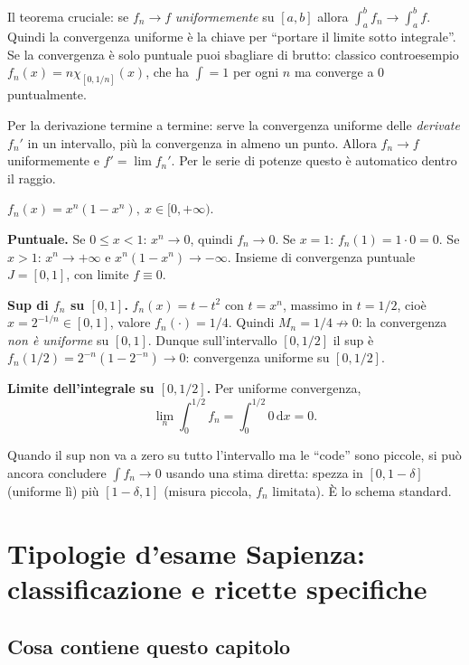 \documentclass[11pt,a4paper,openany]{book}
\theoremstyle{plain}
\theoremstyle{definition}
\theoremstyle{remark}
\newcommand{\dd}{\,\mathrm{d}}
\begin{document}
\begin{nota}
Il teorema cruciale: se $f_n\to f$ \emph{uniformemente} su $[a,b]$
allora $\int_a^b f_n\to\int_a^b f$. Quindi la convergenza
uniforme \`e la chiave per ``portare il limite sotto integrale''.
Se la convergenza \`e solo puntuale puoi sbagliare di brutto: classico
controesempio $f_n(x)=n\chi_{[0,1/n]}(x)$, che ha $\int=1$ per ogni $n$
ma converge a $0$ puntualmente.

Per la derivazione termine a termine: serve la convergenza uniforme
delle \emph{derivate} $f_n'$ in un intervallo, pi\`u la convergenza in
almeno un punto. Allora $f_n\to f$ uniformemente e $f'=\lim f_n'$.
Per le serie di potenze questo \`e automatico dentro il raggio.
\end{nota}

\begin{esempio}[title={Tipo Sapienza --- 4/7/2024}]
$\displaystyle f_n(x)=x^n(1-x^n),\ x\in[0,+\infty)$.

\textbf{Puntuale.} Se $0\le x<1$: $x^n\to 0$, quindi $f_n\to 0$.
Se $x=1$: $f_n(1)=1\cdot 0=0$. Se $x>1$: $x^n\to+\infty$ e
$x^n(1-x^n)\to-\infty$. Insieme di convergenza puntuale
$J=[0,1]$, con limite $f\equiv 0$.

\textbf{Sup di $f_n$ su $[0,1]$.} $f_n(x)=t-t^2$ con $t=x^n$,
massimo in $t=1/2$, cio\`e $x=2^{-1/n}\in[0,1]$, valore
$f_n(\cdot)=1/4$. Quindi $M_n=1/4\not\to 0$: la convergenza
\emph{non \`e uniforme} su $[0,1]$. Dunque sull'intervallo $[0,1/2]$
il sup \`e $f_n(1/2)=2^{-n}(1-2^{-n})\to 0$: convergenza uniforme su
$[0,1/2]$.

\textbf{Limite dell'integrale su $[0,1/2]$.} Per uniforme convergenza,
\[
\lim_n\int_0^{1/2}f_n=\int_0^{1/2}0\dd x=0.
\]
\end{esempio}

\begin{trappola}
Quando il sup non va a zero su tutto l'intervallo ma le ``code'' sono
piccole, si pu\`o ancora concludere $\int f_n\to 0$ usando una stima
diretta: spezza in $[0,1-\delta]$ (uniforme l\`i) pi\`u $[1-\delta,1]$
(misura piccola, $f_n$ limitata). \`E lo schema standard.
\end{trappola}


\chapter{Tipologie d'esame Sapienza: classificazione e ricette specifiche}

\section*{Cosa contiene questo capitolo}
\end{document}
